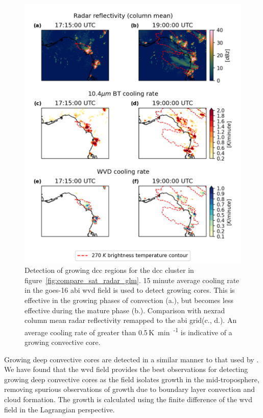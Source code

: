 \begin{figure}[t]
    \includegraphics[width=\textwidth]{figures/chapter1_16.png}
    \caption[
    Detection of growing \acrshort{dcc} regions for the \acrshort{dcc} cluster in figure~\ref{fig:compare_sat_radar_glm}
    ]{
    Detection of growing \acrshort{dcc} regions for the \acrshort{dcc} cluster in figure~\ref{fig:compare_sat_radar_glm}. 15 minute average cooling rate in the \acrshort{goes}-16 \acrshort{abi} \acrshort{wvd} field is used to detect growing cores. This is effective in the growing phases of convection (a.), but becomes less effective during the mature phase (b.). Comparison with \acrshort{nexrad} column mean radar reflectivity remapped to the \acrshort{abi} grid(c., d.). An average cooling rate of greater than 0.5\,\unit{K min\textsuperscript{-1}} is indicative of a growing convective core.
    }
    \label{fig:core_detection}
\end{figure}

Growing deep convective cores are detected in a similar manner to that used by \citet{zinner_cb-tram:_2008}.
We have found that the \acrshort{wvd} field provides the best observations for detecting growing deep convective cores as the field isolates growth in the mid-troposphere, removing spurious observations of growth due to boundary layer convection and cloud formation.
The growth is calculated using the finite difference of the \acrshort{wvd} field in the Lagrangian perspective.

